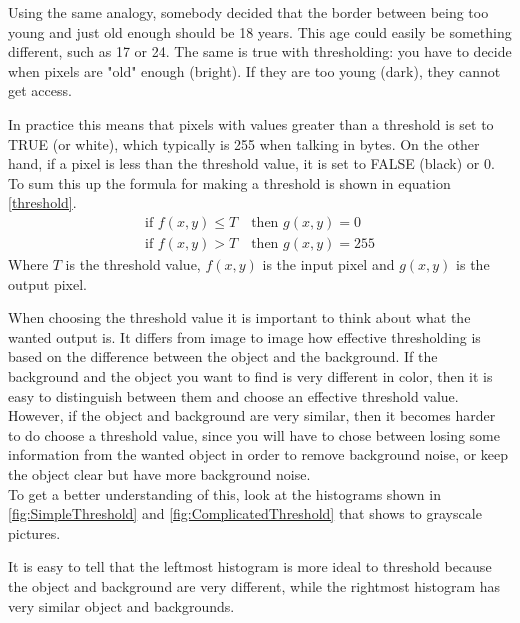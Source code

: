 Using the same analogy, somebody decided that the border between being too young and just old enough should be 18 years. This age could easily be something different, such as 17 or 24. The same is true with thresholding: you have to decide when pixels are "old" enough (bright). If they are too young (dark), they cannot get access.

In practice this means that pixels with values greater than a threshold is set to TRUE (or white), which typically is 255 when talking in bytes. On the other hand, if a pixel is less than the threshold value, it is set to FALSE (black) or 0. To sum this up the formula for making a threshold is shown in equation \ref{threshold}.
\begin{equation}
  \begin{aligned}
  	\text{if } f(x,y)\leq T \quad \text{then } g(x,y)=0 \\
  	\text{if } f(x,y)>T \quad \text{then } g(x,y)=255
	\label{threshold}  
  \end{aligned} 
\end{equation}
Where $T$ is the threshold value, $f(x,y)$ is the input pixel and $g(x,y)$ is the output pixel. 

When choosing the threshold value it is important to think about what the wanted output is. It differs  from image to image how effective thresholding is based on the difference between the object and the background. If the background and the object you want to find is very different in color, then it is easy to distinguish between them and choose an effective threshold value. However, if the object and background are very similar, then it becomes harder to do choose a threshold value, since you will have to chose between losing some information from the wanted object in order to remove background noise, or keep the object clear but have more background noise. \\
To get a better understanding of this, look at the histograms shown in \eqref{fig:SimpleThreshold} and \eqref{fig:ComplicatedThreshold} that shows to grayscale pictures.

It is easy to tell that the leftmost histogram is more ideal to threshold because the object and background are very different, while the rightmost histogram has very similar object and backgrounds.

